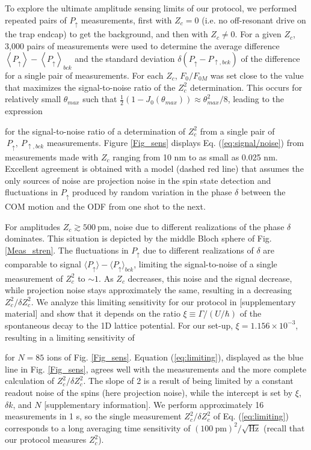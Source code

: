 \documentclass[aps,prl,twocolumn,superscriptaddress,floatfix,nofootinbib]{revtex4-1}
\begin{document}
To explore the ultimate amplitude sensing limits of our protocol, we performed repeated pairs of $P_{\uparrow}$ measurements,
first with $Z_c = 0$ (i.e. no off-resonant drive on the trap endcap)
to get the background, and then with $Z_{c}\neq0$. For a given $Z_{c}$,
3,000 pairs of measurements were used to determine the average difference $\left\langle P_{\uparrow}\right\rangle -\left\langle P_{\uparrow}\right\rangle _{bck}$
and the standard deviation $\delta\left( P_{\uparrow} - P_{\uparrow ,bck} \right)$
of the difference for a single pair of measurements. For each $Z_c$, $F_{0}/F_{0M}$ was set close to the value that maximizes the signal-to-noise ratio of
the $Z_{c}^{2}$ determination. This occurs for relatively small
$\theta_{max}$ such that $\frac{1}{2}\left(1-J_{0}\left(\theta_{max}\right)\right)\approx\theta_{max}^{2}/8$, leading to the expression 

for the signal-to-noise ratio of a determination of $Z_{c}^{2}$ from a single pair of $\ P_{\uparrow},\: P_{\uparrow, bck}$ measurements. Figure \ref{Fig_sens} displays Eq. (\ref{eq:signal/noise}) from measurements made with $Z_{c}$
ranging from 10 nm to as small as 0.025 nm. Excellent agreement is
obtained with a model (dashed red line) that assumes the only sources
of noise are projection noise in the spin state detection and fluctuations
in $P_{\uparrow}$ produced by random variation in the phase $\delta$ between the COM motion and the ODF from one shot to the next.

For amplitudes $Z_{c}\gtrsim 500\:\mathrm{pm}$, noise due to different realizations of the phase $\delta$ dominates. This situation is depicted by the middle Bloch sphere of Fig. \ref{Meas_stren}. The fluctuations in $P_{\uparrow}$ due to different realizations of $\delta$ are comparable to signal $\langle P_{\uparrow}\rangle - \langle P_{\uparrow} \rangle_{bck}$, limiting the signal-to-noise of a single measurement of $Z_{c}^{2}$
to $\sim1$. As $Z_{c}$ decreases, this noise and the signal
decrease, while projection noise stays approximately the same, resulting
in a decreasing $Z_{c}^{2}/\delta Z_{c}^{2}$. We analyze this limiting sensitivity for our protocol in [supplementary material] and show that
it depends on the ratio $\xi\equiv\Gamma/\left(U/\hbar\right)$ of the spontaneous decay to the 1D lattice potential. For
our set-up, $\xi=1.156\times10^{-3}$, resulting in a limiting sensitivity
of 

for $N=85$ ions of Fig. \ref{Fig_sens}. Equation (\ref{eq:limiting}), displayed as the blue line in Fig. \ref{Fig_sens}, agrees well with the measurements and the more complete calculation of ${Z_{c}^{2}}/{\delta Z_{c}^{2}}$. The slope of 2 is a result of being limited by a constant readout noise of the spins (here projection noise), while the intercept is set by $\xi$, $\delta k$, and $N$ [supplementary information]. We perform approximately 16 measurements in 1 s, so the single measurement ${Z_{c}^{2}}/{\delta Z_{c}^{2}}$
of Eq. (\ref{eq:limiting}) corresponds to a long averaging time sensitivity of $\left(100\:\mathrm{pm}\right)^{2}/\sqrt{\mathrm{Hz}}$ (recall that our protocol measures $Z_{c}^2$).
\end{document}
